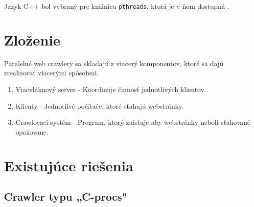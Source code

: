 \documentclass[10pt,twocolumn,twoside,slovak,a4paper]{article}
\begin{document}
Jazyk C++ bol vybraný pre knižnicu \texttt{pthreads}, ktorá je v ňom dostupná \cite{9648837}. 

\section{Zloženie}

Paralelné web crawlery sa skladajú z viacerý komponentov, ktoré sa dajú zrealizovať viacerými spôsobmi. \cite{9645918} \cite{kausar2013web} %

\begin{enumerate}
	\item Viacvláknový server - Koordinuje činnosť jednotlivých klientov.
	\item Klienty - Jednotlivé počítače, ktoré sťahujú webstránky.
	\item Crawlovací systém - Program, ktorý zaisťuje aby webstránky neboli sťahované opakovane.
\end{enumerate}

\section{Existujúce riešenia}
	\subsection{Crawler typu „C-procs" \cite{sharma2011novel}} %

\newpage

\nocite{*}


\end{document}
